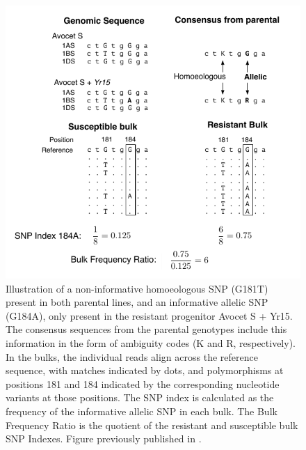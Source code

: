 \begin{figure}
\includegraphics[width=1\textwidth]{Yr15/Figures/bfr.pdf}
\caption{Illustration of a non-informative homoeologous SNP (G181T) present in both parental lines, and an informative allelic SNP (G184A), only present in the resistant progenitor Avocet S + Yr15. The consensus sequences from the parental genotypes include this information in the form of ambiguity codes (K and R, respectively). In the bulks, the individual reads align across the reference sequence, with matches indicated by dots, and polymorphisms at positions 181 and 184 indicated by the corresponding nucleotide variants at those positions. The SNP index is calculated as the frequency of the informative allelic SNP in each bulk. The Bulk Frequency Ratio is the quotient of the resistant and susceptible bulk SNP Indexes. Figure previously published in \citet{Ramirez-Gonzalez2015c}. }
\label{fig:yr15:bfr}
\end{figure}

